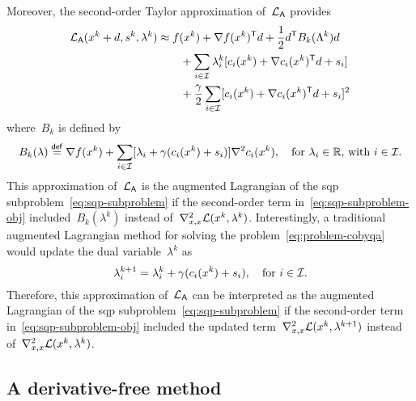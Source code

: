 Moreover, the second-order Taylor approximation of~$\lag[\mathsf{A}]$ provides
\begin{align*}
    \lag[\mathsf{A}](\iter[k] + d, s^k, \lambda^k)   & \approx \obj(\iter[k]) + \nabla \obj(\iter[k])^{\T} d + \frac{1}{2} d^{\T} B_k(\Lambda^k) d\\
                                                & \qquad + \sum_{i \in \iub} \lambda_i^k [\con{i}(\iter[k]) + \nabla \con{i}(\iter[k])^{\T} d + s_i]\\
                                                & \qquad + \frac{\gamma}{2} \sum_{i \in \iub} [\con{i}(\iter[k]) + \nabla \con{i}(\iter[k])^{\T} d + s_i]^2\\
\end{align*}
where~$B_k$ is defined by
\begin{equation*}
    B_k(\lambda) \eqdef \nabla \obj(\iter[k]) + \sum_{i \in \iub} [\lambda_i + \gamma (\con{i}(\iter[k]) + s_i)] \nabla^2 \con{i}(\iter[k]), \quad \text{for~$\lambda_i \in \R$, with~$i \in \iub$.}
\end{equation*}
This approximation of~$\lag[\mathsf{A}]$ is the augmented Lagrangian of the \gls{sqp} subproblem~\cref{eq:sqp-subproblem} if the second-order term in~\cref{eq:sqp-subproblem-obj} included~$B_k(\lambda^k)$ instead of~$\nabla_{x, x}^2 \lag(\iter[k], \lambda^k)$.
Interestingly, a traditional augmented Lagrangian method for solving the problem~\cref{eq:problem-cobyqa} would update the dual variable~$\lambda^k$ as
\begin{equation*}
    \lambda_i^{k + 1} = \lambda_i^k + \gamma (\con{i}(\iter[k]) + s_i), \quad \text{for~$i \in \iub$}.
\end{equation*}
Therefore, this approximation of~$\lag[\mathsf{A}]$ can be interpreted as the augmented Lagrangian of the \gls{sqp} subproblem~\cref{eq:sqp-subproblem} if the second-order term in~\cref{eq:sqp-subproblem-obj} included the updated term~$\nabla_{x, x}^2 \lag(\iter[k], \lambda^{k + 1})$ instead of~$\nabla_{x, x}^2 \lag(\iter[k], \lambda^k)$.

\subsection{A derivative-free  method}

